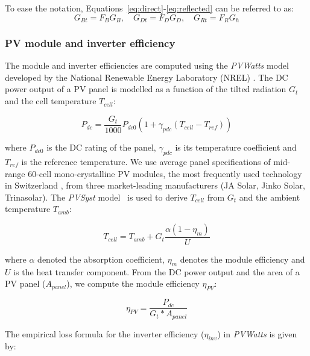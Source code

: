 To ease the notation, Equations~\ref{eq:direct}-\ref{eq:reflected} can be referred to as:
\begin{equation}
\label{eq:tilted_irrad_simplified}
G_{Bt} = F_B G_B, \quad G_{Dt} = F_D G_D, \quad G_{Rt} = F_R G_h
\end{equation}



\subsubsection{PV module and inverter efficiency}
\label{app:efficiency}

The module and inverter efficiencies are computed using the \textit{PVWatts} model developed by the National Renewable Energy Laboratory (NREL) \cite{dobos_pvwatts_2014}. The DC power output of a PV panel is modelled as a function of the tilted radiation $G_t$ and the cell temperature $T_{cell}$:

\begin{equation}
\label{eq:Pdc}
    P_{dc} = \frac{G_{t}}{1000} P_{dc0} (1 + \gamma_{pdc}(T_{cell}-T_{ref}))
\end{equation}

where $P_{dc0}$ is the DC rating of the panel, $\gamma_{pdc}$ is its temperature coefficient and $T_{ref}$ is the reference temperature.
%
We use average panel specifications of mid-range 60-cell mono-crystalline PV modules, the most frequently used technology in Switzerland \cite{buffat_scalable_2018}, from three market-leading manufacturers (JA Solar, Jinko Solar, Trinasolar).
%
The \textit{PVSyst} model~\cite{faiman_assessing_2008} is used to derive $T_{cell}$ from $G_t$ and the ambient temperature $T_{amb}$:

\begin{equation}
    T_{cell} = T_{amb} + G_t \frac{\alpha (1 - \eta_m)}{U}
\end{equation}

where $\alpha$ denoted the absorption coefficient, $\eta_m$ denotes the module efficiency and $U$ is the heat transfer component. 
%
From the DC power output and the area of a PV panel ($A_{panel}$), we compute the module efficiency $\eta_{PV}$:

\begin{equation}
\label{eq:eff}
    \eta_{PV} = \frac{P_{dc}}{G_{t} * A_{panel} }
\end{equation}

The empirical loss formula for the inverter efficiency ($\eta_{inv}$) in \textit{PVWatts} is given by:

